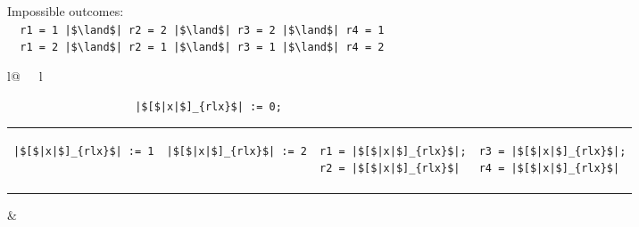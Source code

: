\begin{minipage}[t]{0.3\linewidth}
Impossible outcomes:\\
\lstinline{  r1 = 1 |$\land$| r2 = 2 |$\land$| r3 = 2 |$\land$| r4 = 1}\\
\lstinline{  r1 = 2 |$\land$| r2 = 1 |$\land$| r3 = 1 |$\land$| r4 = 2}\\
\end{minipage}
%
\begin{minipage}[t]{0.3\linewidth}
\vspace{-.2cm}
  \begin{tabular}{l@{\ \ \ }l}
    \begin{minipage}[l]{4.3cm} \small
\begin{lstlisting}
                    |$[$|x|$]_{rlx}$| := 0;
\end{lstlisting}
\vspace{-.2cm}
\begin{tabular}{l||l||l||l}
\begin{lstlisting}
|$[$|x|$]_{rlx}$| := 1
\end{lstlisting}
\hspace{.6cm}
&
\begin{lstlisting}
|$[$|x|$]_{rlx}$| := 2
\end{lstlisting}
\hspace{.6cm}
&
\begin{lstlisting}
r1 = |$[$|x|$]_{rlx}$|;
r2 = |$[$|x|$]_{rlx}$|
\end{lstlisting}
\hspace{.6cm}
&
\begin{lstlisting}
r3 = |$[$|x|$]_{rlx}$|;
r4 = |$[$|x|$]_{rlx}$|
\end{lstlisting}
\end{tabular}
    \end{minipage}
&
  \end{tabular}
\end{minipage}
\litmusTestEnd

